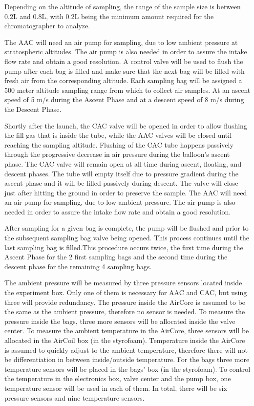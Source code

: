 Depending on the altitude of sampling, the range of the sample size is between 0.2L and 0.8L, with 0.2L being the minimum amount required for the chromatographer to analyze. 

The AAC will need an air pump for sampling, due to low ambient pressure at stratospheric altitudes. The air pump is also needed in order to assure the intake flow rate and obtain a good resolution. A control valve will be used to flush the pump after each bag is filled and make sure that the next bag will be filled with fresh air from the corresponding altitude. Each sampling bag will be assigned a 500 meter altitude sampling range from which to collect air samples. At an ascent speed of 5 m/s during the Ascent Phase and at a descent speed of 8 m/s during the Descent Phase. 

Shortly after the launch, the CAC valve will be opened in order to allow flushing the fill gas that is inside the tube, while the AAC valves will be closed until reaching the sampling altitude. Flushing of the CAC tube happens passively through the progressive decrease in air pressure during the balloon's ascent phase. The CAC valve will remain open at all time during ascent, floating, and descent phases. The tube will empty itself due to pressure gradient during the ascent phase and it will be filled passively during descent. The valve will close just after hitting the ground in order to preserve the sample. The AAC will need an air pump for sampling, due to low ambient pressure. The air pump is also needed in order to assure the intake flow rate and obtain a good resolution.

After sampling for a given bag is complete, the pump will be flushed and prior to the subsequent sampling bag valve being opened. This process continues until the last sampling bag is filled.This procedure occurs twice, the first time during the Ascent Phase for the 2 first sampling bags and the second time during the descent phase for the remaining 4 sampling bags.

The ambient pressure will be measured by three pressure sensors located inside the experiment box. Only one of them is necessary for AAC and CAC, but using three will provide redundancy. The pressure inside the AirCore is assumed to be the same as the ambient pressure, therefore no sensor is needed. To measure the pressure inside the bags, three more sensors will be allocated inside the valve center. To measure the ambient temperature in the AirCore, three sensors will be allocated in the AirCoil box (in the styrofoam). Temperature inside the AirCore is assumed to quickly adjust to the ambient temperature, therefore there will not be differentiation in between inside/outside temperature. For the bags three more temperature sensors will be placed in the bags' box (in the styrofoam). To control the temperature in the electronics box, valve center and the pump box, one temperature sensor will be used in each of them. In total, there will be six pressure sensors and nine temperature sensors. 


